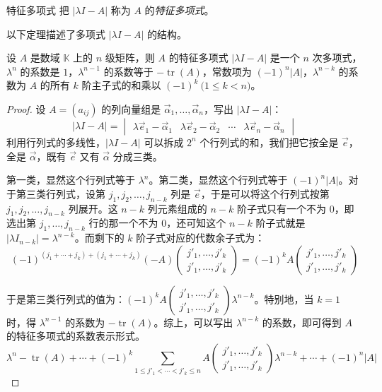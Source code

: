 \begin{definition}{特征多项式}
	把 $|\lambda I - A|$ 称为 $A$ 的\emph{特征多项式}。
\end{definition}

以下定理描述了多项式 $|\lambda I - A|$ 的结构。

\begin{theorem}
	设 $A$ 是数域 $\mathbb K$ 上的 $n$ 级矩阵，则 $A$ 的特征多项式 $|\lambda I - A|$ 是一个 $n$ 次多项式，$\lambda^n$ 的系数是 $1$，$\lambda^{n - 1}$ 的系数等于 $-\operatorname{tr}(A)$，常数项为 $(-1)^n |A|$，$\lambda^{n - k}$ 的系数为 $A$ 的所有 $k$ 阶主子式的和乘以 $(-1)^k \pod{1 \le k < n}$。
\end{theorem}

\begin{proof}
	设 $A = (a_{ij})$ 的列向量组是 $\vec \alpha_1, \ldots, \vec \alpha_n$，写出 $|\lambda I - A|$：
	$$
	|\lambda I - A| =
	\begin{vmatrix} \lambda \vec e_1 - \vec \alpha_1 & \lambda \vec e_2 - \vec \alpha_2 & \cdots & \lambda \vec e_n - \vec \alpha_n \end{vmatrix}
	$$
	利用行列式的多线性，$|\lambda I - A|$ 可以拆成 $2^n$ 个行列式的和，我们把它按全是 $\vec e$，全是 $\vec \alpha$，既有 $\vec e$ 又有 $\vec \alpha$ 分成三类。

	第一类，显然这个行列式等于 $\lambda^n$。第二类，显然这个行列式等于 $(-1)^n |A|$。对于第三类行列式，设第 $j_1, j_2, \ldots, j_{n - k}$ 列是 $\vec e$，于是可以将这个行列式按第 $j_1, j_2, \ldots, j_{n - k}$ 列展开。这 $n - k$ 列元素组成的 $n - k$ 阶子式只有一个不为 $0$，即选出第 $j_1, \ldots, j_{n - k}$ 行的那一个不为 $0$，还可知这个 $n - k$ 阶子式就是 $|\lambda I_{n - k}| = \lambda^{n - k}$。而剩下的 $k$ 阶子式对应的代数余子式为：
	$$
	(-1)^{(j_1 + \cdots + j_k) + (j_1 + \cdots + j_k)} (-A) \begin{pmatrix} j'_1, \ldots, j'_k \\ j'_1, \ldots, j'_k \end{pmatrix} = (-1)^k A \begin{pmatrix} j'_1, \ldots, j'_k \\ j'_1, \ldots, j'_k \end{pmatrix}
	$$

	于是第三类行列式的值为：$(-1)^k A \begin{pmatrix} j'_1, \ldots, j'_k \\ j'_1, \ldots, j'_k \end{pmatrix} \lambda^{n - k}$。特别地，当 $k = 1$ 时，得 $\lambda^{n - 1}$ 的系数为 $-\operatorname{tr}(A)$。综上，可以写出 $\lambda^{n - k}$ 的系数，即可得到 $A$ 的特征多项式的系数表示形式。
	$$
	\lambda^n - \operatorname{tr}(A) + \cdots + (-1)^k \sum\limits_{1 \le j'_1 < \cdots < j'_k \le n} A \begin{pmatrix} j'_1, \ldots, j'_k \\ j'_1, \ldots, j'_k \end{pmatrix} \lambda^{n - k} + \cdots + (-1)^n |A|
	$$
\end{proof}

